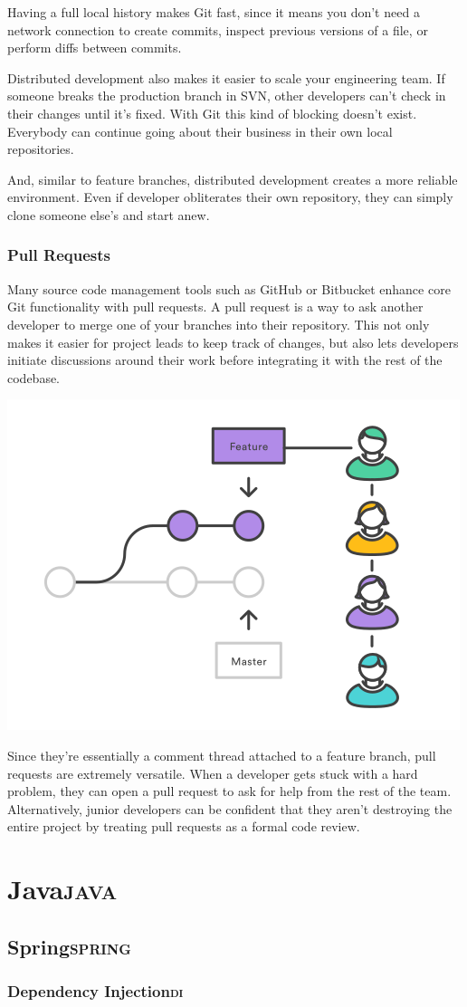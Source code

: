 \documentclass[11pt]{article}
\begin{document}
Having a full local history makes Git fast, since it means you don’t need a network connection to create commits, inspect previous versions of a file, or perform diffs between commits.

Distributed development also makes it easier to scale your engineering team. If someone breaks the production branch in SVN, other developers can’t check in their changes until it’s fixed. With Git this kind of blocking doesn’t exist. Everybody can continue going about their business in their own local repositories.

And, similar to feature branches, distributed development creates a more reliable environment. Even if developer obliterates their own repository, they can simply clone someone else’s and start anew.
\subsubsection{Pull Requests}
\label{sec-1-5-3}
Many source code management tools such as GitHub or Bitbucket enhance core Git functionality with pull requests. A pull request is a way to ask another developer to merge one of your branches into their repository. This not only makes it easier for project leads to keep track of changes, but also lets developers initiate discussions around their work before integrating it with the rest of the codebase.

\includegraphics[width=.9\linewidth]{./img/4.png}

Since they're essentially a comment thread attached to a feature branch, pull requests are extremely versatile. When a developer gets stuck with a hard problem, they can open a pull request to ask for help from the rest of the team. Alternatively, junior developers can be confident that they aren't destroying the entire project by treating pull requests as a formal code review.
\section{Java\hfill{}\textsc{java}}
\label{sec-2}
\subsection{Spring\hfill{}\textsc{spring}}
\label{sec-2-1}
\subsubsection{Dependency Injection\hfill{}\textsc{di}}
\label{sec-2-1-1}
\end{document}
